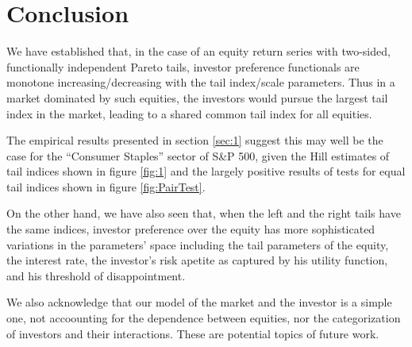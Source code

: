 \section{Conclusion}
\label{sec:4}
We have established that, in the case of an equity return series with
two-sided, functionally independent Pareto tails, investor
preference functionals are monotone increasing/decreasing with the
tail index/scale parameters. Thus in a market dominated by such
equities, the investors would pursue the largest tail index in the
market, leading to a shared common tail index for all equities.

The empirical results presented in section \ref{sec:1} suggest this
may well be the case for the ``Consumer Staples'' sector of S\&P 500,
given the Hill estimates of tail indices shown in figure \ref{fig:1}
and the largely positive results of tests for equal tail indices shown
in figure \ref{fig:PairTest}.

On the other hand, we have also seen that, when the left and the right
tails have the same indices, investor preference over the equity has
more sophisticated variations in the parameters' space including the
tail parameters of the equity, the interest rate, the investor's risk
apetite as captured by his utility function, and his threshold of
disappointment.

We also acknowledge that our model of the market and the investor is a
simple one, not accoounting for the dependence between equities, nor
the categorization of investors and their interactions. These are
potential topics of future work.

